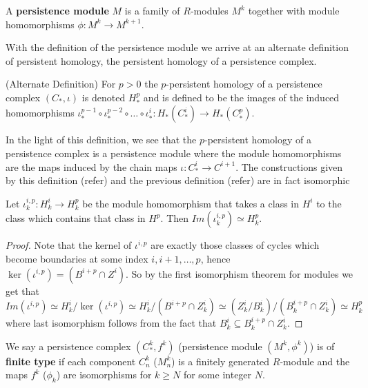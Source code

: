 \begin{definition}
  A \textbf{persistence module} $M$ is a family of $R$-modules $M^{k}$ together with module homomorphisms $\phi: M^{k} \to M^{k+1}$.
\end{definition}
With the definition of the persistence module we arrive at an alternate definition of persistent homology, the persistent homology of a persistence complex.
\begin{definition}(Alternate Definition) For $p>0$ the $p$-persistent homology of a persistence complex $(C_{*}, \iota)$ is denoted $H^{p}_{*}$ and is defined to be the images of the induced homomorphisms $\iota^{p-1}_{*} \circ \iota^{p-2}_{*} \circ \dots \circ \iota^{i}_{*}: H_{*}(C_{*}^{i}) \to H_{*}(C^{p}_{*})$.
\end{definition}
In the light of this definition, we see that the $p$-persistent homology of a persistence complex is a persistence module where the module homomorphisms are the maps induced by the chain maps $\iota: C^{i}_{*} \to C^{i+1}$. The constructions given by this definition (refer) and the previous definition (refer) are in fact isomorphic
\begin{lemma}
Let $\iota^{i,p}_k: H^{i}_{k} \to H^{p}_{k}$ be the module homomorphism that takes a class in $H^{i}$ to the class which contains that class in $H^{p}$. Then $Im (\iota^{i,p}_{k}) \simeq H^{p}_{k}$.
\end{lemma}
\begin{proof}
  Note that the kernel of $\iota^{{i,p}}$ are exactly those classes of cycles which become boundaries at some index $i,i+1,\dots,p$, hence $\ker (\iota^{i,p}) = (B^{i+p} \cap Z^{i})$. So by the first isomorphism theorem for modules we get that
  \[ Im (\iota^{i,p}) \simeq H^{i}_{k} / \ker(\iota^{i,p}) \simeq H^{i}_{k} / (B^{i+p} \cap Z_{k}^{i}) \simeq (Z^{i}_{k}/B^{i}_{k})/(B^{i+p}_{k}\cap Z^{i}_{k}) \simeq H^{p}_{k} \]
  where last isomorphism follows from the fact that $B^{i}_{k} \subseteq B_{k}^{i+p} \cap Z^{i}_{k}$.
\end{proof}

\begin{definition}
We say a persistence complex $(C^{k}_{*}, f^{k})$ (persistence module $(M^{k}, \phi^{k})$) is of \textbf{finite type} if each component $C^{k}_{n}$ ($M^{k}_{n}$) is a finitely generated $R$-module and the maps $f^{k}$ ($\phi_{k}$) are isomorphisms for $k \geq N$ for some integer $N$.
\end{definition}

